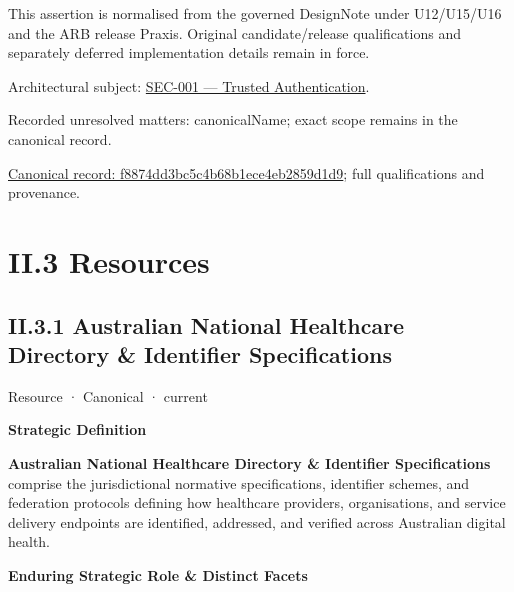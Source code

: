 This assertion is normalised from the governed DesignNote under U12/U15/U16 and the ARB release Praxis. Original candidate/release qualifications and separately deferred implementation details remain in force.



Architectural subject: \hyperref[element:e4998b0a132c41afbe610b11869c3297]{SEC-001 — Trusted Authentication}.


{\small Recorded unresolved matters: canonicalName; exact scope remains in the canonical record.}\par
{\footnotesize \href{../../../../continuum/strategy/course-of-action/implementation-guideline/f8874dd3bc5c4b68b1ece4eb2859d1d9.md}{Canonical record: f8874dd3bc5c4b68b1ece4eb2859d1d9}; full qualifications and provenance.}\par
\chapter*{II.3 Resources}
\label{navigation:II.3}

\section*{II.3.1 Australian National Healthcare Directory \& Identifier Specifications}
\label{navigation:II.3.1}

\label{element:eac71c56624d43bda2b9d3648f14603a}
{\small Resource · Canonical · current}\par

\par\medskip\textbf{Strategic Definition}\par


\textbf{Australian National Healthcare Directory \& Identifier Specifications} comprise the jurisdictional normative specifications, identifier schemes, and federation protocols defining how healthcare providers, organisations, and service delivery endpoints are identified, addressed, and verified across Australian digital health.



\par\medskip\textbf{Enduring Strategic Role \& Distinct Facets}\par


